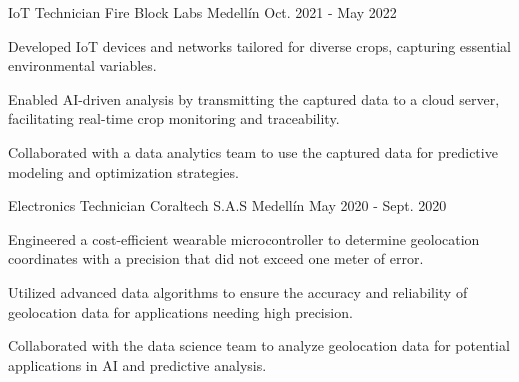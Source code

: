 \begin{cventries}
\cventry
{IoT Technician} %
{Fire Block Labs} %
{Medellín} %
{Oct. 2021 - May 2022} %
{
  \begin{cvitems} %
    \item {Developed IoT devices and networks tailored for diverse crops, capturing essential environmental variables.}
    \item {Enabled AI-driven analysis by transmitting the captured data to a cloud server, facilitating real-time crop monitoring and traceability.}
    \item {Collaborated with a data analytics team to use the captured data for predictive modeling and optimization strategies.}
  \end{cvitems}
}

\cventry
{Electronics Technician} %
{Coraltech S.A.S} %
{Medellín} %
{May 2020 - Sept. 2020} %
{
  \begin{cvitems} %
    \item {Engineered a cost-efficient wearable microcontroller to determine geolocation coordinates with a precision that did not exceed one meter of error.}
    \item {Utilized advanced data algorithms to ensure the accuracy and reliability of geolocation data for applications needing high precision.}
    \item {Collaborated with the data science team to analyze geolocation data for potential applications in AI and predictive analysis.}
  \end{cvitems}
}

\end{cventries}
